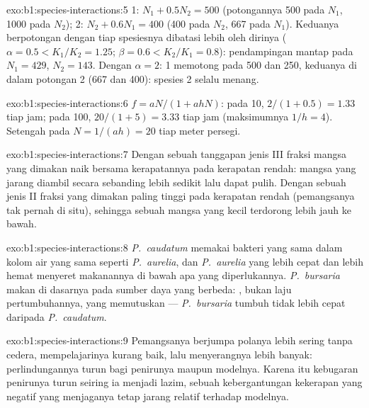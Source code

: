 \begin{solution}{exo:b1:species-interactions:5}
 1: $N_1 + 0.5 N_2 = 500$ (potongannya 500 pada $N_1$, 1000 pada
$N_2$);  2: $N_2 + 0.6 N_1 = 400$ (400 pada $N_2$, 667 pada $N_1$).
Keduanya berpotongan dengan tiap spesiesnya dibatasi lebih oleh dirinya ($\alpha = 0.5 <
K_1/K_2 = 1.25$; $\beta = 0.6 < K_2/K_1 = 0.8$): pendampingan mantap
pada $N_1 = 429$, $N_2 = 143$. Dengan $\alpha = 2$:  1 memotong
pada 500 dan 250, keduanya di dalam potongan  2 (667 dan 400):
spesies 2 selalu menang.
\end{solution}

\begin{solution}{exo:b1:species-interactions:6}
$f = aN/(1 + ahN)$: pada 10, $2/(1 + 0.5) = 1.33$ tiap jam; pada 100,
$20/(1 + 5) = 3.33$ tiap jam (maksimumnya $1/h = 4$). Setengah 
pada $N = 1/(ah) = 20$ tiap meter persegi.
\end{solution}

\begin{solution}{exo:b1:species-interactions:7}
Dengan sebuah tanggapan jenis III fraksi mangsa yang dimakan naik
bersama kerapatannya pada kerapatan rendah: mangsa yang jarang diambil
secara sebanding lebih sedikit lalu dapat pulih. Dengan sebuah jenis
II fraksi yang dimakan paling tinggi pada kerapatan rendah
(pemangsanya tak pernah  di situ), sehingga sebuah 
mangsa yang kecil terdorong lebih jauh ke bawah.
\end{solution}

\begin{solution}{exo:b1:species-interactions:8}
\emph{P.~caudatum} memakai bakteri yang sama dalam kolom air yang sama
seperti \emph{P.~aurelia}, dan \emph{P.~aurelia} yang lebih cepat dan
lebih hemat menyeret makanannya di bawah apa yang diperlukannya.
\emph{P.~bursaria} makan di dasarnya pada sumber daya yang berbeda:
, bukan laju pertumbuhannya, yang memutuskan ---
\emph{P.~bursaria} tumbuh tidak lebih cepat daripada \emph{P.~caudatum}.
\end{solution}

\begin{solution}{exo:b1:species-interactions:9}
Pemangsanya berjumpa polanya lebih sering tanpa cedera, mempelajarinya
kurang baik, lalu menyerangnya lebih banyak: perlindungannya turun
bagi penirunya maupun modelnya. Karena itu kebugaran penirunya turun
seiring ia menjadi lazim, sebuah kebergantungan kekerapan yang negatif
yang menjaganya tetap jarang relatif terhadap modelnya.
\end{solution}

